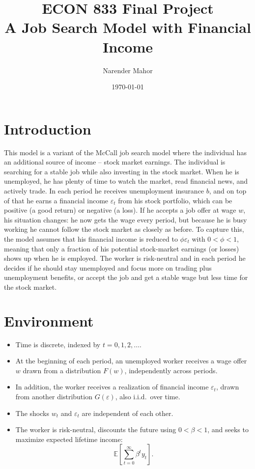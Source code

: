 \documentclass{article}
\title{ECON 833 Final Project \\ \large A Job Search Model with Financial Income}
\author{Narender Mahor}
\date{\today}
\begin{document}
	
	\maketitle
	
	\section*{Introduction}
	This model is a variant of the McCall job search model where the individual has an additional source of income -- stock market earnings. The individual is searching for a stable job while also investing in the stock market. When he is unemployed, he has plenty of time to watch the market, read financial news, and actively trade. In each period he receives unemployment insurance $b$, and on top of that he earns a financial income $\varepsilon_t$ from his stock portfolio, which can be positive (a good return) or negative (a loss). If he accepts a job offer at wage $w$, his situation changes: he now gets the wage every period, but because he is busy working he cannot follow the stock market as closely as before. To capture this, the model assumes that his financial income is reduced to $\phi \varepsilon_t$ with $0 < \phi < 1$, meaning that only a fraction of his potential stock-market earnings (or losses) shows up when he is employed. The worker is risk-neutral and in each period he decides if he should stay unemployed and focus more on trading plus unemployment benefits, or accept the job and get a stable wage but less time for the stock market.
	
	\section*{Environment}
	\label{sec:model}
	\begin{itemize}
		\item Time is discrete, indexed by $t = 0,1,2,\dots$.
		\item At the beginning of each period, an unemployed worker receives a wage offer $w$ drawn from a distribution $F(w)$, independently across periods.
		\item In addition, the worker receives a realization of financial income $\varepsilon_t$, drawn from another distribution $G(\varepsilon)$, also i.i.d.\ over time.
		\item The shocks $w_t$ and $\varepsilon_t$ are independent of each other.
		\item The worker is risk-neutral, discounts the future using $0 < \beta < 1$, and seeks to maximize expected lifetime income:
		\[
		\mathbb{E}\left[ \sum_{t=0}^{\infty} \beta^t y_t \right].
		\]
	\end{itemize}
	
\end{document}
